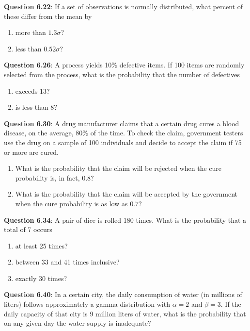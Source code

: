\documentclass{article}
\begin{document}
    \noindent\textbf{Question 6.22}: If a set of observations is normally distributed,
    what percent of these differ from the mean by
        \begin{enumerate}[label = (\alph*) ]
            \item more than $1.3\sigma$?
            \item less than $0.52\sigma$?
        \end{enumerate}

    \noindent\textbf{Question 6.26}: A process yields 10\% defective items. If 100
    items are randomly selected from the process, what is the probability 
    that the number of defectives
        \begin{enumerate}[label = (\alph*) ]
            \item exceeds 13?
            \item is less than 8?
        \end{enumerate}

    \noindent\textbf{Question 6.30}: A drug manufacturer claims that a certain drug
    cures a blood disease, on the average, 80\% of the time. To check the 
    claim, government testers use the drug on a sample of 100 individuals 
    and decide to accept the claim if 75 or more are cured.
        \begin{enumerate}[label = (\alph*) ]
            \item What is the probability that the claim will be rejected 
            when the cure probability is, in fact, 0.8?
            \item What is the probability that the claim will be accepted 
            by the government when the cure probability is as low as 0.7?
        \end{enumerate}

    \noindent\textbf{Question 6.34}: A pair of dice is rolled 180 times. What is the
    probability that a total of 7 occurs
        \begin{enumerate}[label = (\alph*) ]
            \item at least 25 times?
            \item between 33 and 41 times inclusive?
            \item exactly 30 times?
        \end{enumerate}

    \noindent\textbf{Question 6.40}: In a certain city, the daily consumption of water
    (in millions of liters) follows approximately a gamma distribution with 
    $\alpha = 2$ and $\beta = 3$. If the daily capacity of that city is 9 
    million liters of water, what is the probability that on any given day 
    the water supply is inadequate?\\\\
\end{document}
